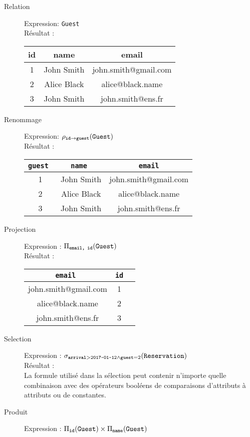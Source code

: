 \documentclass{cours}
\begin{document}
\begin{description}
    \item[Relation] Expression: \texttt{Guest}\\
    Résultat : \begin{tabular}{ccc}
        \toprule
        id & name & email\\
        \midrule
        1 & John Smith & john.smith@gmail.com\\
        2 & Alice Black & alice@black.name\\
        3 & John Smith & john.smith@ens.fr\\
        \bottomrule
    \end{tabular}
    \item[Renommage] Expression: $\rho_{\texttt{id}\to\texttt{guest}}(\texttt{Guest})$\\
    Résultat : \begin{tabular}{ccc}
        \toprule
        \tt guest & \tt name & \tt email\\
        \midrule
        1 & John Smith & john.smith@gmail.com\\
        2 & Alice Black & alice@black.name\\
        3 & John Smith & john.smith@ens.fr\\
        \bottomrule
    \end{tabular}
    \item[Projection] Expression : $\Pi_{\texttt{email, id}}(\texttt{Guest})$\\
    Résultat : \begin{tabular}{ccc}
        \toprule
        \tt email & \tt id\\
        \midrule
        john.smith@gmail.com & 1\\
        alice@black.name & 2\\
        john.smith@ens.fr & 3\\
        \bottomrule
    \end{tabular}
    \item[Selection] Expression : $\sigma_{\texttt{arrival}>\texttt{2017-01-12}\land\texttt{guest}=2}(\texttt{Reservation})$\\
    Résultat : \\
    La formule utilisé dans la sélection peut contenir n'importe quelle combinaison avec des opérateurs booléens de comparaisons d'attributs à attributs ou de constantes.
    \item[Produit] Expression : $\Pi_{\texttt{id}}(\texttt{Guest}) \times \Pi_{\texttt{name}}(\texttt{Guest})$\\

\end{description}
\end{document}
